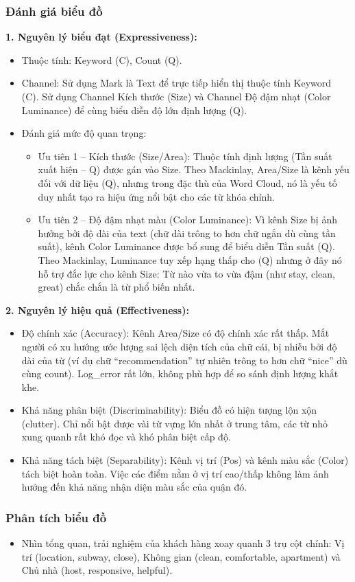\subsubsection{Đánh giá biểu đồ}

\textbf{1. Nguyên lý biểu đạt (Expressiveness):}

\begin{itemize}
    \item Thuộc tính: Keyword (C), Count (Q).
    \item Channel: Sử dụng Mark là Text để trực tiếp hiển thị thuộc tính Keyword (C). Sử dụng Channel Kích thước (Size) và Channel Độ đậm nhạt (Color Luminance) để cùng biểu diễn độ lớn định lượng (Q).
    \item Đánh giá mức độ quan trọng:
    \begin{itemize}
        \item Ưu tiên 1 -- Kích thước (Size/Area): Thuộc tính định lượng (Tần suất xuất hiện -- Q) được gán vào Size. Theo Mackinlay, Area/Size là kênh yếu đối với dữ liệu (Q), nhưng trong đặc thù của Word Cloud, nó là yếu tố duy nhất tạo ra hiệu ứng nổi bật cho các từ khóa chính.
        \item Ưu tiên 2 -- Độ đậm nhạt màu (Color Luminance): Vì kênh Size bị ảnh hưởng bởi độ dài của text (chữ dài trông to hơn chữ ngắn dù cùng tần suất), kênh Color Luminance được bổ sung để biểu diễn Tần suất (Q). Theo Mackinlay, Luminance tuy xếp hạng thấp cho (Q) nhưng ở đây nó hỗ trợ đắc lực cho kênh Size: Từ nào vừa to vừa đậm (như stay, clean, great) chắc chắn là từ phổ biến nhất.
    \end{itemize}
\end{itemize}

\textbf{2. Nguyên lý hiệu quả (Effectiveness):}

\begin{itemize}
    \item Độ chính xác (Accuracy): Kênh Area/Size có độ chính xác rất thấp. Mắt người có xu hướng ước lượng sai lệch diện tích của chữ cái, bị nhiễu bởi độ dài của từ (ví dụ chữ ``recommendation'' tự nhiên trông to hơn chữ ``nice'' dù cùng count). Log\_error rất lớn, không phù hợp để so sánh định lượng khắt khe.
    \item Khả năng phân biệt (Discriminability): Biểu đồ có hiện tượng lộn xộn (clutter). Chỉ nổi bật được vài từ vựng lớn nhất ở trung tâm, các từ nhỏ xung quanh rất khó đọc và khó phân biệt cấp độ.
    \item Khả năng tách biệt (Separability): Kênh vị trí (Pos) và kênh màu sắc (Color) tách biệt hoàn toàn. Việc các điểm nằm ở vị trí cao/thấp không làm ảnh hưởng đến khả năng nhận diện màu sắc của quận đó.
\end{itemize}

\subsubsection{Phân tích biểu đồ}

\begin{itemize}
    \item Nhìn tổng quan, trải nghiệm của khách hàng xoay quanh 3 trụ cột chính: Vị trí (location, subway, close), Không gian (clean, comfortable, apartment) và Chủ nhà (host, responsive, helpful).
\end{itemize}
